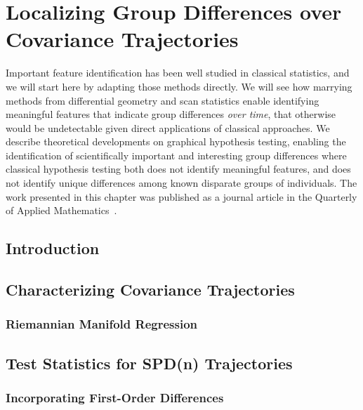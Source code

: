 \chapter{Localizing Group Differences over Covariance Trajectories}\label{chap:covtraj}

Important feature identification has been well studied 
in classical statistics, and 
we will start here by adapting those
methods directly.
We will see how marrying
methods from differential geometry
and scan statistics enable
identifying meaningful features
that indicate group differences \textit{over time},
that otherwise would be undetectable
given direct applications of classical
approaches.
We describe theoretical developments
on graphical hypothesis testing,
enabling the identification of 
scientifically important and interesting 
group differences
where classical hypothesis testing
both does not identify meaningful features,
and does not identify unique differences
among known disparate groups of individuals.
The work presented in this chapter was published as a journal article in the Quarterly of Applied Mathematics~\citep{covtraj}.


\section{Introduction}

\section{Characterizing Covariance Trajectories}
\label{sec:mglm}

\subsection{Riemannian Manifold Regression}

\section{Test Statistics for SPD(n) Trajectories}
\label{sec:hyp-test}

\subsection{Incorporating First-Order Differences}

